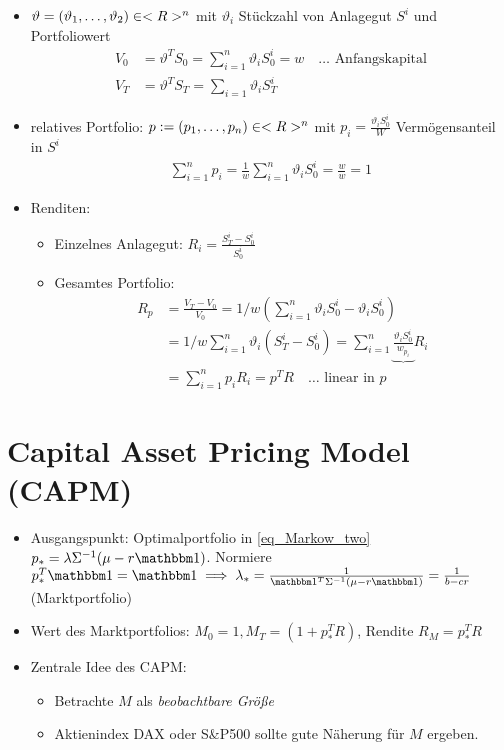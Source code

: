 \begin{*remark}
	\begin{itemize}
		\item $\vartheta = (\vartheta_1, \dots, \vartheta_2) \in <R>^n$ mit $\vartheta_i$ Stückzahl von Anlagegut $S^i$ und Portfoliowert
		\begin{align*}
			V_0 &= \vartheta^T S_0 = \sum_{i=1}^n \vartheta_i S_0^i = w \quad \dots \text{ Anfangskapital}\\
			V_T &= \vartheta^T S_T = \sum_{i=1}\vartheta_i S_T^i
		\end{align*}
		\item relatives Portfolio: $p := (p_1, \dots, p_n) \in <R>^n$ mit $p_i = \frac{\vartheta_i S_0^i}{W}$ Vermögensanteil in $S^i$
		\begin{align*}
			\sum_{i=1}^n p_i = \frac1w\sum_{i=1}^n \vartheta_i S_0^i = \frac w w = 1
		\end{align*}
		\item Renditen: 
		\begin{itemize}
			\item Einzelnes Anlagegut: $R_i = \frac{S_T^i - S_0^i}{S_0^i}$
			\item Gesamtes Portfolio: 
			\begin{align*}
				R_p &= \frac{V_T - V_0}{V_0} = 1/w (\sum_{i=1}^n \vartheta_i S_0^i - \vartheta_i S_0^i)\\
				&= 1/w \sum_{i=1}^n \vartheta_i(S_T^i - S_0^i) = \sum_{i=1}^n \underbrace{\frac{\vartheta_i S_0^i}{w_{p_i}}}R_i\\
				&= \sum_{i=1}^n p_i R_i = p^T R \quad \dots \text{ linear in }p
			\end{align*}
		\end{itemize}
	\end{itemize}
\end{*remark}
\section{Capital Asset Pricing Model (CAPM)}
\begin{itemize}
	\item Ausgangspunkt: Optimalportfolio in \eqref{eq_Markow_two} $p_{\ast} = \lambda \Sigma^{-1}(\mu - r\indi)$. Normiere $p_{\ast}^T \indi = \indi \implies \lambda_{\ast} = \frac{1}{\indi^T \Sigma^{-1} (\mu - r \indi)} = \frac{1}{b-cr}$ (Marktportfolio)
	\item Wert des Marktportfolios: $M_0 = 1, M_T = (1+ p_{\ast}^T R)$, Rendite $R_M = p_{\ast}^T R$
	\item Zentrale Idee des CAPM:
	\begin{itemize}
		\item Betrachte $M$ als \emph{beobachtbare Größe}
		\item Aktienindex DAX oder S\&P500 sollte gute Näherung für $M$ ergeben.
	\end{itemize}
\end{itemize}
